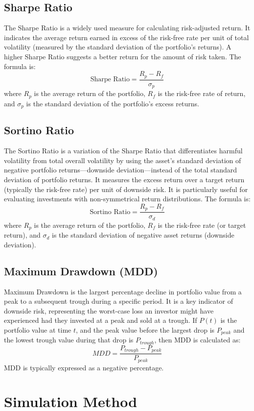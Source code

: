 \subsection{Sharpe Ratio}
The Sharpe Ratio is a widely used measure for calculating risk-adjusted return. It indicates the average return earned in excess of the risk-free rate per unit of total volatility (measured by the standard deviation of the portfolio's returns). A higher Sharpe Ratio suggests a better return for the amount of risk taken. The formula is:
\[ \text{Sharpe Ratio} = \frac{R_p - R_f}{\sigma_p} \]
where \(R_p\) is the average return of the portfolio, \(R_f\) is the risk-free rate of return, and \(\sigma_p\) is the standard deviation of the portfolio's excess returns.

\subsection{Sortino Ratio}
The Sortino Ratio is a variation of the Sharpe Ratio that differentiates harmful volatility from total overall volatility by using the asset's standard deviation of negative portfolio returns—downside deviation—instead of the total standard deviation of portfolio returns. It measures the excess return over a target return (typically the risk-free rate) per unit of downside risk. It is particularly useful for evaluating investments with non-symmetrical return distributions. The formula is:
\[ \text{Sortino Ratio} = \frac{R_p - R_f}{\sigma_d} \]
where \(R_p\) is the average return of the portfolio, \(R_f\) is the risk-free rate (or target return), and \(\sigma_d\) is the standard deviation of negative asset returns (downside deviation).

\subsection{Maximum Drawdown (MDD)}
Maximum Drawdown is the largest percentage decline in portfolio value from a peak to a subsequent trough during a specific period. It is a key indicator of downside risk, representing the worst-case loss an investor might have experienced had they invested at a peak and sold at a trough. If \(P(t)\) is the portfolio value at time \(t\), and the peak value before the largest drop is \(P_{peak}\) and the lowest trough value during that drop is \(P_{trough}\), then MDD is calculated as:
\[ MDD = \frac{P_{trough} - P_{peak}}{P_{peak}} \]
MDD is typically expressed as a negative percentage.

\section{Simulation Method}

